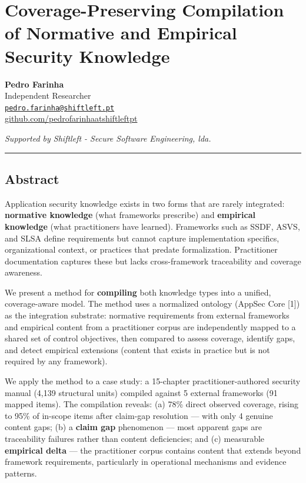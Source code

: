 \documentclass[
]{article}
\author{}
\date{}
\begin{document}
\section{Coverage-Preserving Compilation of Normative and Empirical
Security
Knowledge}\label{coverage-preserving-compilation-of-normative-and-empirical-security-knowledge}

\textbf{Pedro Farinha}\\
Independent Researcher\\
\href{mailto:pedro.farinha@shiftleft.pt}{\nolinkurl{pedro.farinha@shiftleft.pt}}\\
\href{https://github.com/pedrofarinhaatshiftleftpt}{github.com/pedrofarinhaatshiftleftpt}

\emph{Supported by Shiftleft - Secure Software Engineering, lda.}

\begin{center}\rule{0.5\linewidth}{0.5pt}\end{center}

\subsection{Abstract}\label{abstract}

Application security knowledge exists in two forms that are rarely
integrated: \textbf{normative knowledge} (what frameworks prescribe) and
\textbf{empirical knowledge} (what practitioners have learned).
Frameworks such as SSDF, ASVS, and SLSA define requirements but cannot
capture implementation specifics, organizational context, or practices
that predate formalization. Practitioner documentation captures these
but lacks cross-framework traceability and coverage awareness.

We present a method for \textbf{compiling} both knowledge types into a
unified, coverage-aware model. The method uses a normalized ontology
(AppSec Core {[}1{]}) as the integration substrate: normative
requirements from external frameworks and empirical content from a
practitioner corpus are independently mapped to a shared set of control
objectives, then compared to assess coverage, identify gaps, and detect
empirical extensions (content that exists in practice but is not
required by any framework).

We apply the method to a case study: a 15-chapter practitioner-authored
security manual (4,139 structural units) compiled against 5 external
frameworks (91 mapped items). The compilation reveals: (a) 78\% direct
observed coverage, rising to 95\% of in-scope items after claim-gap
resolution --- with only 4 genuine content gaps; (b) a \textbf{claim
gap} phenomenon --- most apparent gaps are traceability failures rather
than content deficiencies; and (c) measurable \textbf{empirical delta}
--- the practitioner corpus contains content that extends beyond
framework requirements, particularly in operational mechanisms and
evidence patterns.
\end{document}
